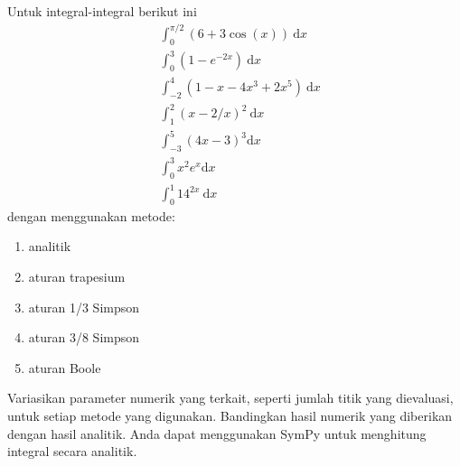 \begin{soal}
Untuk integral-integral berikut ini
\begin{align}
& \int_{0}^{\pi/2} (6 + 3\cos(x))\ \mathrm{d}x \\
& \int_{0}^{3} (1 - e^{-2x})\ \mathrm{d}x \\
& \int_{-2}^{4} (1 - x - 4x^3 + 2x^5)\ \mathrm{d}x \\
& \int_{1}^{2} (x - 2/x)^2\ \mathrm{d}x \\
& \int_{-3}^{5} (4x - 3)^3 \mathrm{d}x \\
& \int_{0}^{3} x^2 e^x \mathrm{d}x \\
& \int_{0}^{1} 14^{2x}\ \mathrm{d}x
\end{align}
dengan menggunakan metode:
\begin{enumerate}[label=(\alph*)]
\item analitik
\item aturan trapesium
\item aturan 1/3 Simpson
\item aturan 3/8 Simpson
\item aturan Boole
\end{enumerate}
Variasikan parameter numerik yang terkait, seperti jumlah titik yang dievaluasi,
untuk setiap metode yang digunakan.
Bandingkan hasil numerik yang diberikan dengan hasil analitik.
Anda dapat menggunakan SymPy untuk menghitung integral secara analitik.
\end{soal}